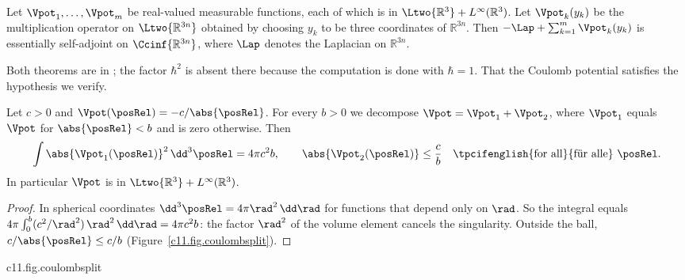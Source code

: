 \begin{fundament}
  \begin{theorem}\label{c11.thm.kato16}
    Let $\Vpot_1, \ldots, \Vpot_m$ be real-valued measurable functions, each of which is
    in $\Ltwo{\mathbb{R}^3} + L^{\infty}(\mathbb{R}^3)$. Let $\Vpot_k(y_k)$ be the
    multiplication operator on $\Ltwo{\mathbb{R}^{3n}}$ obtained by choosing $y_k$ to be
    three coordinates of $\mathbb{R}^{3n}$. Then
    $-\Lap + \sum_{k = 1}^{m} \Vpot_k(y_k)$ is essentially self-adjoint on
    $\Ccinf{\mathbb{R}^{3n}}$, where $\Lap$ denotes the Laplacian on $\mathbb{R}^{3n}$.
  \end{theorem}

  Both theorems are in ; the factor $\hbar^2$
  is absent there because the computation is done with $\hbar = 1$. That the Coulomb
  potential satisfies the hypothesis we verify.

  \begin{lemma}\label{c11.lem.coulomb}
    Let $c > 0$ and $\Vpot(\posRel) = -c/\abs{\posRel}$. For every $b > 0$ we decompose
    $\Vpot = \Vpot_1 + \Vpot_2$, where $\Vpot_1$ equals $\Vpot$ for $\abs{\posRel} < b$
    and is zero otherwise. Then
    \begin{equation}\label{c11.eq.coulombsplit}
      \int \abs{\Vpot_1(\posRel)}^2\,\dd^3\posRel = 4\pi c^2 b,
      \qquad
      \abs{\Vpot_2(\posRel)} \leq \frac{c}{b}\quad\text{\tpcifenglish{for all}{für alle}}\ \posRel .
    \end{equation}
    In particular $\Vpot$ is in $\Ltwo{\mathbb{R}^3} + L^{\infty}(\mathbb{R}^3)$.
  \end{lemma}
  \begin{proof}
    In spherical coordinates $\dd^3\posRel = 4\pi\rad^2\,\dd\rad$ for functions that
    depend only on $\rad$. So the integral equals
    $4\pi\int_0^b (c^2/\rad^2)\,\rad^2\,\dd\rad = 4\pi c^2 b$: the factor $\rad^2$ of the
    volume element cancels the singularity. Outside the ball,
    $c/\abs{\posRel} \leq c/b$ (Figure~\ref{c11.fig.coulombsplit}).
  \end{proof}

  \begin{tpcfigure}{c11.fig.coulombsplit}
    \caption{The decomposition of Lemma~\ref{c11.lem.coulomb}. Inside the radius $b$
      (solid) $\abs{\Vpot}$ grows beyond all bounds but is square-integrable; outside
      (dashed) $\abs{\Vpot}$ is bounded by $c/b$.}
  \end{tpcfigure}


\end{fundament}
